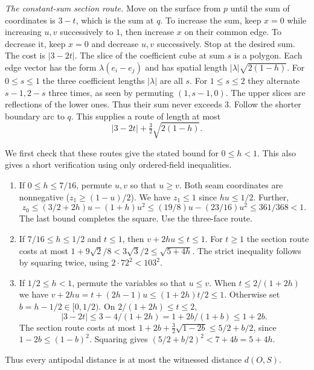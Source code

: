\documentclass[10pt,letterpaper]{article}
\begin{document}
\emph{The constant-sum section route.} Move on the surface from $p$ until
the sum of coordinates is $3-t$, which is the sum at $q$. To increase the
sum, keep $x=0$ while increasing $u,v$ successively to $1$, then increase
$x$ on their common edge. To decrease it, keep $x=0$ and decrease $u,v$
successively. Stop at the desired sum. The cost is $|3-2t|$. The slice of
the coefficient cube at sum $s$ is a polygon. Each edge vector has the form
$\lambda(e_i-e_j)$ and has spatial length $|\lambda|\sqrt{2(1-h)}$.
For $0\le s\le1$ the three coefficient lengths $|\lambda|$ are all $s$. For $1\le s\le2$ they alternate $s-1,2-s$ three times, as seen by
permuting $(1,s-1,0)$. The upper slices are reflections of the lower ones.
Thus their sum never exceeds $3$. Follow the shorter boundary arc to $q$.
This supplies a route of length at most
\[
        |3-2t|+\tfrac32\sqrt{2(1-h)}.
\]

We first check that these routes give the stated bound for $0\le h<1$. This also gives a short
verification using only ordered-field inequalities.
\begin{enumerate}
\item If $0\le h\le7/16$, permute $u,v$ so that $u\ge v$. Both seam
coordinates are nonnegative ($z_1\ge(1-u)/2$). We have $z_1\le1$ since
$hu\le1/2$. Further,
\[
 z_0\le (3/2+2h)u-(1+h)u^2
      \le (19/8)u-(23/16)u^2\le361/368<1.
\]
The last bound completes the square. Use the three-face route.
\item If $7/16\le h\le1/2$ and $t\le1$, then $v+2hu\le t\le1$.
For $t\ge1$ the section route costs at most
$1+9\sqrt{2}/8<3\sqrt{3}/2\le\sqrt{5+4h}$.
The strict inequality follows by squaring twice, using $2\cdot72^2<103^2$.
\item If $1/2\le h<1$, permute the variables so that $u\le v$. When
$t\le2/(1+2h)$ we have $v+2hu=t+(2h-1)u\le(1+2h)t/2\le1$.
Otherwise set $b=h-1/2\in[0,1/2)$. On $2/(1+2h)\le t\le2$,
\[
 |3-2t|\le 3-4/(1+2h)=1+2b/(1+b)\le1+2b.
\]
The section route costs at most
$1+2b+\tfrac32\sqrt{1-2b}\le5/2+b/2$, since
$1-2b\le(1-b)^2$. Squaring gives
$(5/2+b/2)^2<7+4b=5+4h$.
\end{enumerate}
Thus every antipodal distance is at most the witnessed distance $d(O,S)$.
\end{document}
